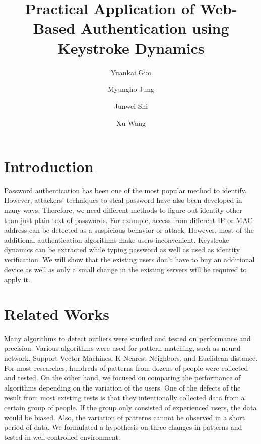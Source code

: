 \documentclass[twocolumn,showpacs,%
  nofootinbib,aps,%
  eqsecnum,prd,notitlepage,showkeys,10pt]{revtex4-1}
\begin{document}
\title{Practical Application of Web-Based Authentication using Keystroke Dynamics}

\author{Yuankai Guo}
\author{Myungho Jung}
\author{Junwei Shi}
\author{Xu Wang}


\maketitle

\section{Introduction}
Password authentication has been one of the most popular method to identify. However, attackers' techniques to steal password have also been developed in many ways. Therefore, we need different methods to figure out identity other than just plain text of passwords. For example, access from different IP or MAC address can be detected as a suspicious behavior or attack. However, most of the additional authentication algorithms make users inconvenient. Keystroke dynamics can be extracted while typing password as well as used as identity verification\cite{gaines1980authentication}. We will show that the existing users don't have to buy an additional device as well as only a small change in the existing servers will be required to apply it.

\section{Related Works}
Many algorithms to detect outliers were studied and tested on performance and precision\cite{shanmugapriya2009survey}. Various algorithms were used for pattern matching, such as neural network, Support Vector Machines, K-Nearest Neighbors, and Euclidean distance. For most researches, hundreds of patterns from dozens of people were collected and tested. On the other hand, we focused on comparing the performance of algorithms depending on the variation of the users. One of the defects of the result from most existing tests is that they intentionally collected data from a certain group of people. If the group only consisted of experienced users, the data would be biased. Also, the variation of patterns cannot be observed in a short period of data. We formulated a hypothesis on three changes in patterns and tested in well-controlled environment.
\end{document}
